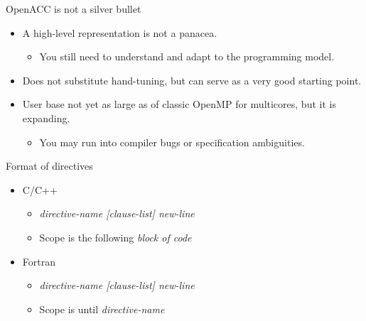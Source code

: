 \documentclass[12pt,aspectratio=169]{beamer}
\begin{document}
\begin{frame}{OpenACC is not a silver bullet}
  \begin{itemize}
  \item A high-level representation is not a panacea.
    \begin{itemize}
    \item You still need to understand and adapt to the programming model.
    \end{itemize}
  \item Does not substitute hand-tuning, but can serve as a very good starting point.
  \item User base not yet as large as of classic OpenMP for multicores, but it is expanding.
    \begin{itemize}
    \item You may run into compiler bugs or specification ambiguities.
    \end{itemize}
  \end{itemize}
\end{frame}

\begin{frame}[fragile]{Format of directives}
  \begin{itemize}
  \item C/C++
    \begin{itemize}
    \item {} \emph{directive-name [clause-list]
      new-line}
    \item Scope is the following \emph{block of code}
    \end{itemize}
  \item Fortran
    \begin{itemize}
    \item {} \emph{directive-name [clause-list]
      new-line}
    \item Scope is until  \emph{directive-name}
    \end{itemize}
  \end{itemize}
\end{frame}
\end{document}
